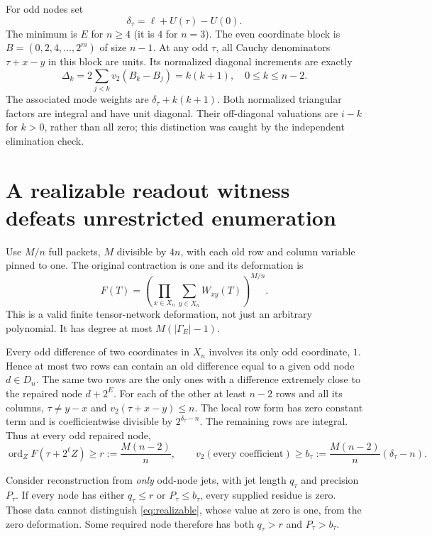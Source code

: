 \documentclass[11pt]{article}
\begin{document}
For odd nodes set
\[
 \delta_\tau=\ell+U(\tau)-U(0).
\]
The minimum is $E$ for $n\ge4$ (it is $4$ for $n=3$).
The even coordinate block is
$B=(0,2,4,\ldots,2^m)$ of size $n-1$.
At any odd $\tau$, all Cauchy denominators $\tau+x-y$ in this block
are units. Its normalized diagonal increments are exactly
\begin{equation}
 \Delta_k=2\sum_{j<k}v_2(B_k-B_j)=k(k+1),
 \quad 0\le k\le n-2.
 \label{eq:quadratic}
\end{equation}
The associated mode weights are $\delta_\tau+k(k+1)$.
Both normalized triangular factors are integral and have unit diagonal.
Their off-diagonal valuations are $i-k$ for $k>0$, rather than all zero;
this distinction was caught by the independent elimination check.

\section{A realizable readout witness defeats unrestricted enumeration}
Use $M/n$ full packets, $M$ divisible by $4n$, with each old row and
column variable pinned to one. The original contraction is one and its
deformation is
\begin{equation}
 F(T)=\left(\prod_{x\in X_n}\sum_{y\in X_n}W_{xy}(T)\right)^{M/n}.
 \label{eq:realizable}
\end{equation}
This is a valid finite tensor-network deformation, not just an arbitrary
polynomial. It has degree at most $M(|\Gamma_E|-1)$.

Every odd difference of two coordinates in $X_n$ involves its only odd
coordinate, $1$. Hence at most two rows can contain an old difference
equal to a given odd node $d\in D_n$. The same two rows are the only
ones with a difference extremely close to the repaired node $d+2^E$.
For each of the other at least $n-2$ rows and all its columns,
$\tau\ne y-x$ and $v_2(\tau+x-y)\le n$.
The local row form has zero constant term and is coefficientwise
divisible by $2^{\delta_\tau-n}$. The remaining rows are integral.
Thus at every odd repaired node,
\begin{equation}
 \operatorname{ord}_Z F(\tau+2^\ell Z)\ge r:=\frac{M(n-2)}n,
 \qquad
 v_2(\text{every coefficient})\ge
 b_\tau:=\frac{M(n-2)}n(\delta_\tau-n).
 \label{eq:witness}
\end{equation}

Consider reconstruction from \emph{only} odd-node jets, with jet length
$q_\tau$ and precision $P_\tau$. If every node has either
$q_\tau\le r$ or $P_\tau\le b_\tau$, every supplied residue is zero.
Those data cannot distinguish \eqref{eq:realizable}, whose value at zero
is one, from the zero deformation. Some required node therefore has
both $q_\tau>r$ and $P_\tau>b_\tau$.
\end{document}
